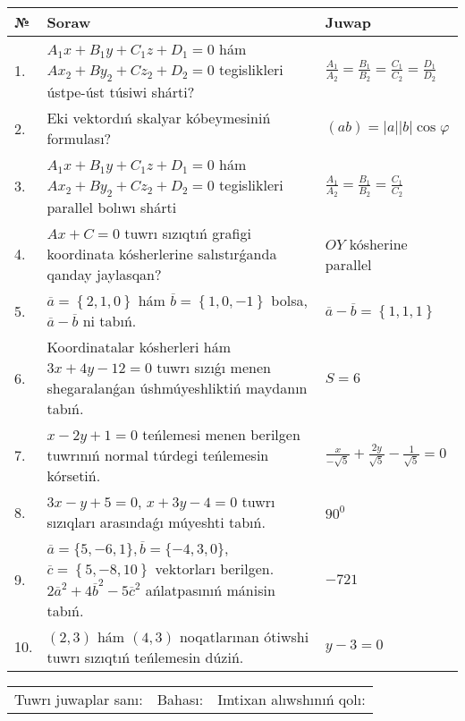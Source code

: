 \documentclass{article}
\begin{document}
\begin{tabular}{|m{0.7cm}|m{10cm}|m{4cm}|}
\hline
№ & Soraw & Juwap \\
\hline
1. & $A_1x+B_1y+C_1z+D_1=0$ hám $Ax_2+By_2+Cz_2+D_2=0$ tegislikleri ústpe-úst túsiwi shárti? & $\frac{A_1}{A_2}=\frac{B_1}{B_2}=\frac{C_1}{C_2}=\frac{D_1}{D_2}$ \\
\hline
2. & Eki vektordıń skalyar kóbeymesiniń formulası? & $(ab)=|a||b|\cos\varphi$ \\
\hline
3. & $A_1x+B_1y+C_1z+D_1=0$ hám $Ax_2+By_2+Cz_2+D_2=0$ tegislikleri parallel bolıwı shárti & $\frac{A_1}{A_2}=\frac{B_1}{B_2}=\frac{C_1}{C_2}$ \\
\hline
4. & $Ax+C=0$ tuwrı sızıqtıń grafigi koordinata kósherlerine salıstırǵanda qanday jaylasqan? & $OY$ kósherine parallel \\
\hline
5. & $\overline{a}=\left\{ 2, 1, 0 \right\}$ hám $\overline{b}=\left\{ 1, 0,-1 \right\}$ bolsa, $\overline{a}-\overline{b}$ ni tabıń. & $\overline{a} -\overline{b} = \left\{ 1,1,1 \right\}$ \\
\hline
6. & Koordinatalar kósherleri hám $ 3x+4y-12=0 $ tuwrı sızıǵı menen shegaralanǵan úshmúyeshliktiń maydanın tabıń. & $ S=6 $ \\
\hline
7. & $x-2y+1=0$ teńlemesi menen berilgen tuwrınıń normal túrdegi teńlemesin kórsetiń. & $\frac{x}{- \sqrt{5}}+\frac{2y}{\sqrt{5}}-\frac{1}{\sqrt{5}}=0$ \\
\hline
8. & $3x-y+5=0$, $x+3y-4=0$ tuwrı sızıqları arasındaǵı múyeshti tabıń. & $90^{0}$ \\
\hline
9. & $\overline{a}=\{5,-6, 1 \}, \overline{b}=\{-4, 3, 0 \} $, $\overline{c}=\left\{ 5,-8, 10 \right\}$ vektorları berilgen. $2{\overline{a}}^{2}+4{\overline{b}}^{2}-5{\overline{c}}^{2}$ ańlatpasınıń mánisin tabıń. & $-721$ \\
\hline
10. & $(2, 3)$ hám $(4, 3)$ noqatlarınan ótiwshi tuwrı sızıqtıń teńlemesin dúziń. & $ y-3=0$ \\
\hline
\end{tabular}

\vspace{1cm}

\begin{tabular}{lll}
Tuwrı juwaplar sanı: \underline{\hspace{1.5cm}} & 
Bahası: \underline{\hspace{1.5cm}} & 
Imtixan alıwshınıń qolı: \underline{\hspace{2cm}} \\
\end{tabular}
\end{document}
